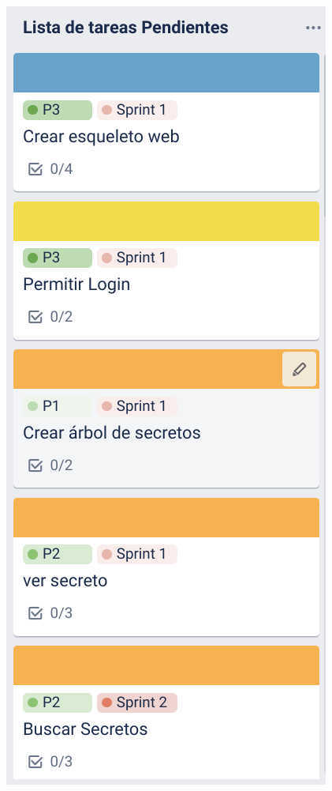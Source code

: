 \documentclass{\ClassPath/viu-tfm-template}
\begin{document}
\begin{minipage}{0.32\linewidth}
    \includegraphics[width=\linewidth]{img/tareas.png}
\end{minipage}
\end{document}
